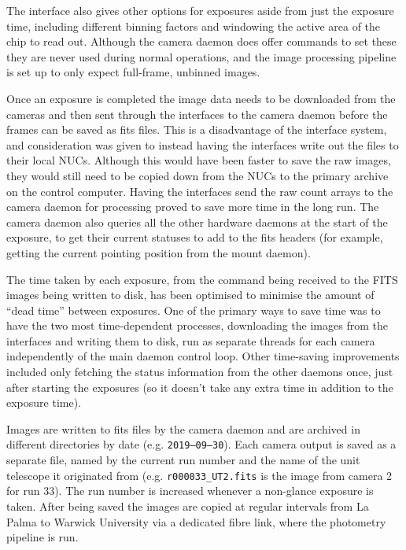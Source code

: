 \begin{colsection}
\begin{colsection}
The  interface also gives other options for exposures aside from just the exposure time, including different binning factors and windowing the active area of the chip to read out. Although the camera daemon does offer commands to set these they are never used during normal operations, and the image processing pipeline is set up to only expect full-frame, unbinned images.

Once an exposure is completed the image data needs to be downloaded from the cameras and then sent through the interfaces to the camera daemon before the frames can be saved as \gls{fits} files. This is a disadvantage of the interface system, and consideration was given to instead having the interfaces write out the files to their local NUCs. Although this would have been faster to save the raw images, they would still need to be copied down from the NUCs to the primary archive on the control computer. Having the interfaces send the raw count arrays to the camera daemon for processing proved to save more time in the long run. The camera daemon also queries all the other hardware daemons at the start of the exposure, to get their current statuses to add to the \gls{fits} headers (for example, getting the current pointing position from the mount daemon). 

The time taken by each exposure, from the command being received to the FITS images being written to disk, has been optimised to minimise the amount of ``dead time'' between exposures. One of the primary ways to save time was to have the two most time-dependent processes, downloading the images from the interfaces and writing them to disk, run as separate threads for each camera independently of the main daemon control loop. Other time-saving improvements included only fetching the status information from the other daemons once, just after starting the exposures (so it doesn't take any extra time in addition to the exposure time).

Images are written to \gls{fits} files by the camera daemon and are archived in different directories by date (e.g. \texttt{2019--09--30}). Each camera output is saved as a separate file, named by the current run number and the name of the unit telescope it originated from (e.g. \texttt{r000033\_UT2.fits} is the image from camera 2 for run 33). The run number is increased whenever a non-glance exposure is taken. After being saved the images are copied at regular intervals from La Palma to Warwick University via a dedicated fibre link, where the photometry pipeline is run. 


\end{colsection}
\end{colsection}
